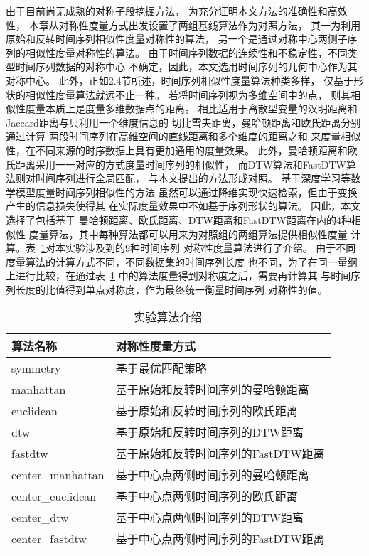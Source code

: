 由于目前尚无成熟的对称子段挖掘方法，
为充分证明本文方法的准确性和高效性，
本章从对称性度量方式出发设置了两组基线算法作为对照方法，
其一为利用原始和反转时间序列相似性度量对称性的算法，
另一个是通过对称中心两侧子序列的相似性度量对称性的算法。
由于时间序列数据的连续性和不稳定性，不同类型时间序列数据的对称中心
不确定，因此，本文选用时间序列的几何中心作为其对称中心。
此外，正如2.4节所述，时间序列相似性度量算法种类多样，
仅基于形状的相似性度量算法就远不止一种。
若将时间序列视为多维空间中的点，
则其相似性度量本质上是度量多维数据点的距离。
相比适用于离散型变量的汉明距离和Jaccard距离与只利用一个维度信息的
切比雪夫距离，曼哈顿距离和欧氏距离分别通过计算
两段时间序列在高维空间的直线距离和多个维度的距离之和
来度量相似性，在不同来源的时序数据上具有更加通用的度量效果。
此外，曼哈顿距离和欧氏距离采用一一对应的方式度量时间序列的相似性，
而DTW算法和FastDTW算法则对时间序列进行全局匹配，
与本文提出的方法形成对照。
基于深度学习等数学模型度量时间序列相似性的方法
虽然可以通过降维实现快速检索，但由于变换产生的信息损失使得其
在实际度量效果中不如基于序列形状的算法。
因此，本文选择了包括基于
曼哈顿距离、欧氏距离、DTW距离和FastDTW距离在内的4种相似性
度量算法，其中每种算法都可以用来为对照组的两组算法提供相似性度量
计算。表~\ref{tab:experiment_algorithm}对本实验涉及到的9种时间序列
对称性度量算法进行了介绍。
由于不同度量算法的计算方式不同，不同数据集的时间序列长度
也不同，为了在同一量纲上进行比较，在通过表~\ref{tab:experiment_algorithm}
中的算法度量得到对称度之后，需要再计算其
与时间序列长度的比值得到单点对称度，作为最终统一衡量时间序列
对称性的值。
\begin{table}
  \centering
  \caption{实验算法介绍}
  \begin{tabular}{ll}
    \toprule
    算法名称          & 对称性度量方式                      \\
    \midrule
    symmetry          & 基于最优匹配策略                    \\
    manhattan         & 基于原始和反转时间序列的曼哈顿距离  \\
    euclidean         & 基于原始和反转时间序列的欧氏距离    \\
    dtw               & 基于原始和反转时间序列的DTW距离     \\
    fastdtw           & 基于原始和反转时间序列的FastDTW距离 \\
    center\_manhattan & 基于中心点两侧时间序列的曼哈顿距离  \\
    center\_euclidean & 基于中心点两侧时间序列的欧氏距离    \\
    center\_dtw       & 基于中心点两侧时间序列的DTW距离     \\
    center\_fastdtw   & 基于中心点两侧时间序列的FastDTW距离 \\
    \bottomrule
  \end{tabular}
  \label{tab:experiment_algorithm}
\end{table}

